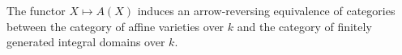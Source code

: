 The functor $X \mapsto A(X)$ induces an arrow-reversing equivalence of categories between the category of affine varieties over $k$ and the category of finitely generated integral domains over $k$.
